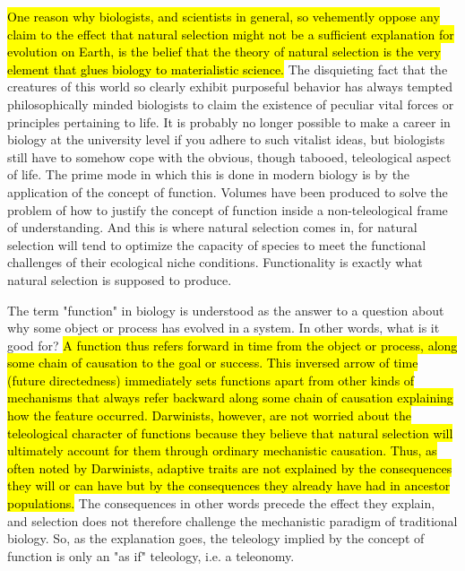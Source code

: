 \begin{longquote}
\hl{One reason why biologists, and scientists in general, so vehemently oppose any claim 
to the effect that natural selection might not be a sufficient explanation for evolution 
on Earth, is the belief that the theory of natural selection is the very element that glues 
biology to materialistic science.} The disquieting fact that the creatures of this world so 
clearly exhibit purposeful behavior has always tempted philosophically minded 
biologists to claim the existence of peculiar vital forces or principles pertaining to life. 
It is probably no longer possible to make a career in biology at the university level if 
you adhere to such vitalist ideas, but biologists still have to somehow cope with the 
obvious, though tabooed, teleological aspect of life. The prime mode in which this is 
done in modern biology is by the application of the concept of function.
 Volumes have been produced to solve the problem of how to justify the concept of function 
inside a non-teleological frame of understanding. And this is where natural selection 
comes in, for natural selection will tend to optimize the capacity of species to meet the 
functional challenges of their ecological niche conditions. Functionality is exactly 
what natural selection is supposed to produce.

The term "function" in biology is understood as the answer to a question about 
why some object or process has evolved in a system. In other words, what is it good 
for? \hl{A function thus refers forward in time from the object or process, along some 
chain of causation to the goal or success. This inversed arrow of time (future 
directedness) immediately sets functions apart from other kinds of mechanisms that 
always refer backward along some chain of causation explaining how the feature 
occurred. Darwinists, however, are not worried about the teleological character of 
functions because they believe that natural selection will ultimately account for them 
through ordinary mechanistic causation. Thus, as often noted by Darwinists, adaptive 
traits are not explained by the consequences they will or can have but by the 
consequences they already have had in ancestor populations.}
 The consequences in other words precede the effect they explain, and selection does not therefore challenge 
the mechanistic paradigm of traditional biology. So, as the explanation goes, the 
teleology implied by the concept of function is only an "as if" teleology, i.e. a 
teleonomy.


\end{longquote}

